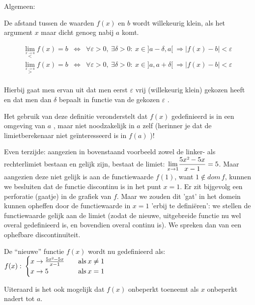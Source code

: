 Algemeen:

De afstand tussen de waarden $f(x)$ en $b$ wordt willekeurig klein,
als het argument $x$ maar dicht genoeg nabij $a$ komt.

\begin{eqnarray*}
{\displaystyle \lim_{\overset{x\rightarrow a}{<}}}f(x)=b & \Leftrightarrow & \forall\varepsilon>0,\:\exists\delta>0:\:x\in]a-\delta,a[\:\Rightarrow\left|f(x)-b\right|<\varepsilon\\
{\displaystyle \lim_{\overset{x\rightarrow a}{>}}}f(x)=b & \Leftrightarrow & \forall\varepsilon>0,\:\exists\delta>0:\:x\in]a,a+\delta[\:\Rightarrow\left|f(x)-b\right|<\varepsilon\\
\end{eqnarray*}

Hierbij gaat men ervan uit dat men eerst $\varepsilon$ vrij (willekeurig
klein) gekozen heeft en dat men dan $\delta$ bepaalt in functie van
de gekozen $\varepsilon$ .

Het gebruik van deze definitie veronderstelt dat $f(x)$ gedefinieerd
is in een omgeving van $a$ , maar niet noodzakelijk in $a$ zelf
(herinner je dat de limietberekenaar niet ge\"interesseerd is in $f(a)$
)! 

Even terzijde: aangezien in bovenstaand voorbeeld zowel
de linker- als rechterlimiet bestaan en gelijk zijn, bestaat de limiet:
${\displaystyle \lim_{x\to1}}{\displaystyle \frac{5x\text{\texttwosuperior}-5x}{x-1}}=5$.
Maar aangezien deze niet gelijk is aan de functiewaarde $f(1)$, want
$1\notin dom\,f$, kunnen we besluiten dat de functie discontinu is
in het punt $x=1$. Er zit bijgevolg een perforatie (gaatje) in de
grafiek van $f$. Maar we zouden dit 'gat' in het domein kunnen opheffen
door de functiewaarde in $x=1$ 'erbij te defini\"eren': we stellen
de functiewaarde gelijk aan de limiet (zodat de nieuwe, uitgebreide
functie nu wel overal gedefinieerd is, en bovendien overal continu
is). We spreken dan van een ophefbare discontinu\"iteit.

De ``nieuwe'' functie $f(x)$ wordt nu gedefinieerd als:
$f(x):\:\begin{cases}
x\rightarrow\frac{5x\text{\texttwosuperior}-5x}{x-1} & \quad\mathrm{als}\:x\neq1\\
x\rightarrow5 & \quad\mathrm{als}\:x=1
\end{cases}$

Uiteraard is het ook mogelijk dat $f(x)$ onbeperkt toeneemt
als $x$ onbeperkt nadert tot $a$. 

